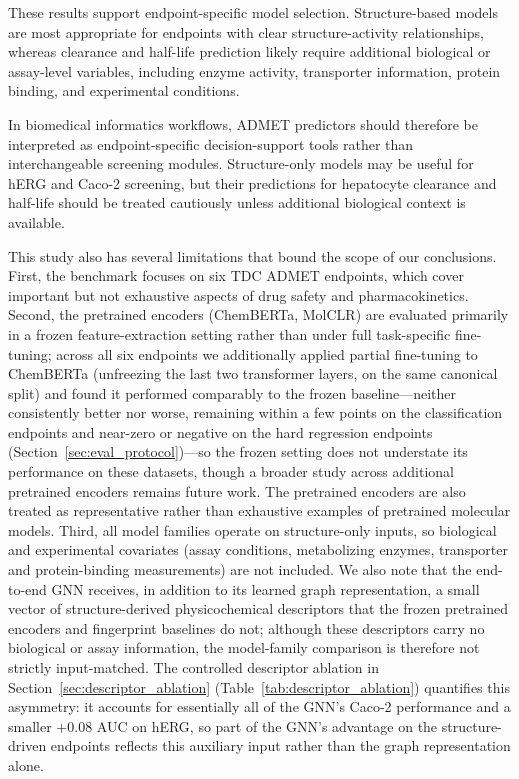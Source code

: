 \documentclass[journal]{IEEEtran}
\begin{document}
These results support endpoint-specific model selection. Structure-based models are most appropriate for endpoints with clear structure-activity relationships, whereas clearance and half-life prediction likely require additional biological or assay-level variables, including enzyme activity, transporter information, protein binding, and experimental conditions.

In biomedical informatics workflows, ADMET predictors should therefore be interpreted as endpoint-specific decision-support tools rather than interchangeable screening modules. Structure-only models may be useful for hERG and Caco-2 screening, but their predictions for hepatocyte clearance and half-life should be treated cautiously unless additional biological context is available.

This study also has several limitations that bound the scope of our conclusions.
First, the benchmark focuses on six TDC ADMET endpoints, which cover important but not exhaustive aspects of drug safety and pharmacokinetics.
Second, the pretrained encoders (ChemBERTa, MolCLR) are evaluated primarily in a frozen feature-extraction setting rather than under full task-specific fine-tuning; across all six endpoints we additionally applied partial fine-tuning to ChemBERTa (unfreezing the last two transformer layers, on the same canonical split) and found it performed comparably to the frozen baseline---neither consistently better nor worse, remaining within a few points on the classification endpoints and near-zero or negative on the hard regression endpoints (Section~\ref{sec:eval_protocol})---so the frozen setting does not understate its performance on these datasets, though a broader study across additional pretrained encoders remains future work. The pretrained encoders are also treated as representative rather than exhaustive examples of pretrained molecular models.
Third, all model families operate on structure-only inputs, so biological and experimental covariates (assay conditions, metabolizing enzymes, transporter and protein-binding measurements) are not included. We also note that the end-to-end GNN receives, in addition to its learned graph representation, a small vector of structure-derived physicochemical descriptors that the frozen pretrained encoders and fingerprint baselines do not; although these descriptors carry no biological or assay information, the model-family comparison is therefore not strictly input-matched. The controlled descriptor ablation in Section~\ref{sec:descriptor_ablation} (Table~\ref{tab:descriptor_ablation}) quantifies this asymmetry: it accounts for essentially all of the GNN's Caco-2 performance and a smaller $+0.08$ AUC on hERG, so part of the GNN's advantage on the structure-driven endpoints reflects this auxiliary input rather than the graph representation alone.
\end{document}
